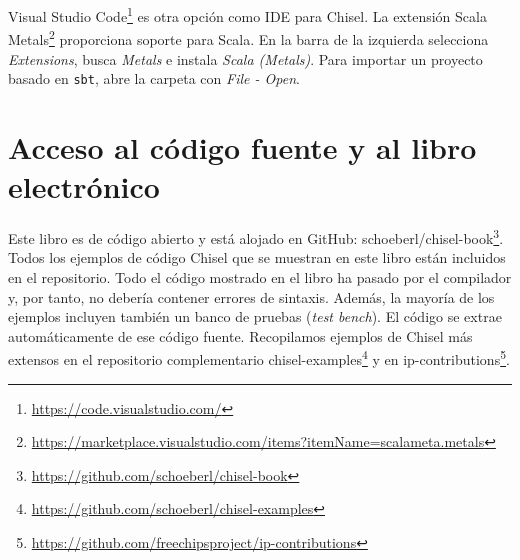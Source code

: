 \documentclass[%
    10pt,
    headinclude, footinclude=false,
    openright, %
    notitlepage,
    cleardoublepage=empty,
    headsepline,
    numbers=noenddot,
    bibliography=totoc, index=totoc,
    ]{scrbook}
\newcommand{\code}[1]{{\lstinline[basicstyle=\small\ttfamily]{#1}}}
\newcommand{\myref}[2]{\href{#1}{#2}}
\renewcommand{\myref}[2]{{#2}{\footnote{\url{#1}}}}
\begin{document}

\myref{https://code.visualstudio.com/}{Visual Studio Code} es otra opción como IDE para Chisel.
La extensión \myref{https://marketplace.visualstudio.com/items?itemName=scalameta.metals}{Scala Metals}
proporciona soporte para Scala.
En la barra de la izquierda selecciona \emph{Extensions}, busca \emph{Metals} e instala \emph{Scala (Metals)}.
Para importar un proyecto basado en \code{sbt}, abre la carpeta con \emph{File - Open}.



\section{Acceso al código fuente y al libro electrónico}


Este libro es de código abierto y está alojado en GitHub: \myref{https://github.com/schoeberl/chisel-book}{schoeberl/chisel-book}.
Todos los ejemplos de código Chisel que se muestran en este libro están incluidos en el repositorio.
Todo el código mostrado en el libro ha pasado por el compilador y, por tanto, no debería contener errores de sintaxis.
Además, la mayoría de los ejemplos incluyen también un banco de pruebas (\emph{test bench}).
El código se extrae automáticamente de ese código fuente.
Recopilamos ejemplos de Chisel más extensos en el repositorio complementario
\myref{https://github.com/schoeberl/chisel-examples}{chisel-examples}
y en \myref{https://github.com/freechipsproject/ip-contributions}{ip-contributions}.
\end{document}
